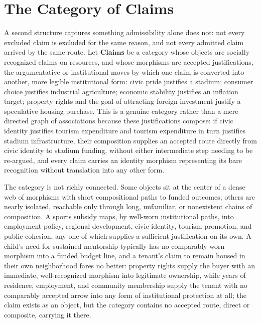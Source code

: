\section{The Category of Claims}

A second structure captures something admissibility alone does not: not every excluded claim is excluded for the same reason, and not every admitted claim arrived by the same route. Let $\mathbf{Claims}$ be a category whose objects are socially recognized claims on resources, and whose morphisms are accepted justifications, the argumentative or institutional moves by which one claim is converted into another, more legible institutional form: civic pride justifies a stadium; consumer choice justifies industrial agriculture; economic stability justifies an inflation target; property rights and the goal of attracting foreign investment justify a speculative housing purchase. This is a genuine category rather than a mere directed graph of associations because these justifications compose: if civic identity justifies tourism expenditure and tourism expenditure in turn justifies stadium infrastructure, their composition supplies an accepted route directly from civic identity to stadium funding, without either intermediate step needing to be re-argued, and every claim carries an identity morphism representing its bare recognition without translation into any other form.

The category is not richly connected. Some objects sit at the center of a dense web of morphisms with short compositional paths to funded outcomes; others are nearly isolated, reachable only through long, unfamiliar, or nonexistent chains of composition. A sports subsidy maps, by well-worn institutional paths, into employment policy, regional development, civic identity, tourism promotion, and public cohesion, any one of which supplies a sufficient justification on its own. A child's need for sustained mentorship typically has no comparably worn morphism into a funded budget line, and a tenant's claim to remain housed in their own neighborhood fares no better: property rights supply the buyer with an immediate, well-recognized morphism into legitimate ownership, while years of residence, employment, and community membership supply the tenant with no comparably accepted arrow into any form of institutional protection at all; the claim exists as an object, but the category contains no accepted route, direct or composite, carrying it there.

